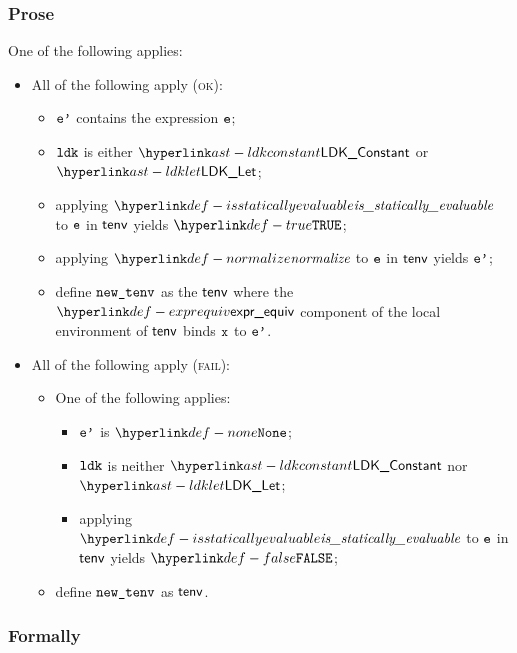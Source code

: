 \subsubsection{Prose}
One of the following applies:
\begin{itemize}
  \item All of the following apply (\textsc{ok}):
  \begin{itemize}
    \item $\vep$ contains the expression $\ve$;
    \item $\ldk$ is either $\LDKConstant$ or $\LDKLet$;
    \item applying $\isstaticallyevaluable$ to $\ve$ in $\tenv$ yields $\True$;
    \item applying $\normalize$ to $\ve$ in $\tenv$ yields $\vep$\ProseOrTypeError;
    \item define $\newtenv$ as the $\tenv$ where the $\exprequiv$ component of the local environment
          of $\tenv$ binds $\vx$ to $\vep$.
  \end{itemize}

  \item All of the following apply (\textsc{fail}):
  \begin{itemize}
    \item One of the following applies:
    \begin{itemize}
      \item $\vep$ is $\None$;
      \item $\ldk$ is neither $\LDKConstant$ nor $\LDKLet$;
      \item applying $\isstaticallyevaluable$ to $\ve$ in $\tenv$ yields $\False$;
    \end{itemize}
    \item define $\newtenv$ as $\tenv$.
  \end{itemize}
\end{itemize}

\subsubsection{Formally}
\begin{mathpar}
\end{mathpar}

